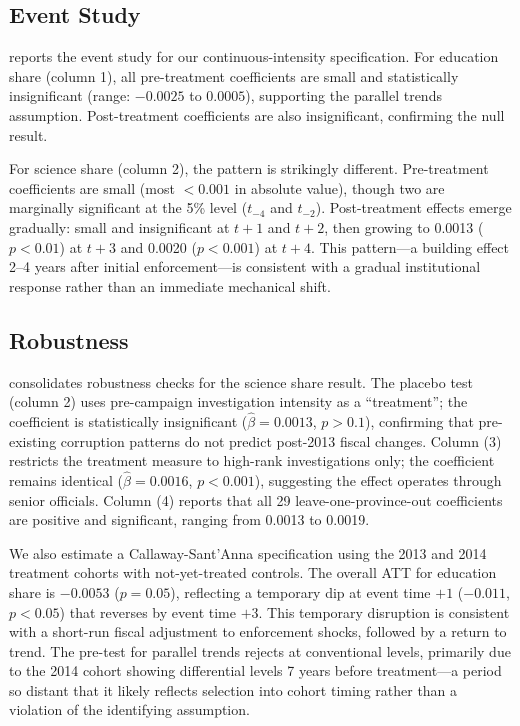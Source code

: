\documentclass[12pt]{article}
\begin{document}


\subsection{Event Study}

 reports the event study for our continuous-intensity specification. For education share (column 1), all pre-treatment coefficients are small and statistically insignificant (range: $-0.0025$ to $0.0005$), supporting the parallel trends assumption. Post-treatment coefficients are also insignificant, confirming the null result.

For science share (column 2), the pattern is strikingly different. Pre-treatment coefficients are small (most $< 0.001$ in absolute value), though two are marginally significant at the 5\% level ($t_{-4}$ and $t_{-2}$). Post-treatment effects emerge gradually: small and insignificant at $t + 1$ and $t + 2$, then growing to 0.0013 ($p < 0.01$) at $t + 3$ and 0.0020 ($p < 0.001$) at $t + 4$. This pattern---a building effect 2--4 years after initial enforcement---is consistent with a gradual institutional response rather than an immediate mechanical shift.



\subsection{Robustness}

 consolidates robustness checks for the science share result. The placebo test (column 2) uses pre-campaign investigation intensity as a ``treatment''; the coefficient is statistically insignificant ($\hat{\beta} = 0.0013$, $p > 0.1$), confirming that pre-existing corruption patterns do not predict post-2013 fiscal changes. Column (3) restricts the treatment measure to high-rank investigations only; the coefficient remains identical ($\hat{\beta} = 0.0016$, $p < 0.001$), suggesting the effect operates through senior officials. Column (4) reports that all 29 leave-one-province-out coefficients are positive and significant, ranging from 0.0013 to 0.0019.

We also estimate a Callaway-Sant'Anna specification using the 2013 and 2014 treatment cohorts with not-yet-treated controls. The overall ATT for education share is $-0.0053$ ($p = 0.05$), reflecting a temporary dip at event time $+1$ ($-0.011$, $p < 0.05$) that reverses by event time $+3$. This temporary disruption is consistent with a short-run fiscal adjustment to enforcement shocks, followed by a return to trend. The pre-test for parallel trends rejects at conventional levels, primarily due to the 2014 cohort showing differential levels 7 years before treatment---a period so distant that it likely reflects selection into cohort timing rather than a violation of the identifying assumption.
\end{document}

